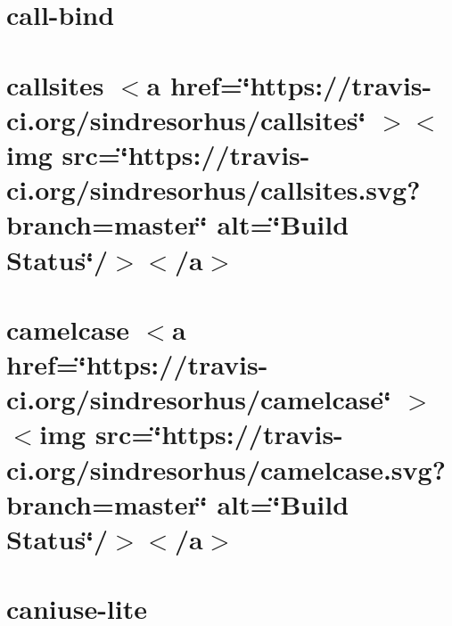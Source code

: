 \documentclass[twoside]{book}
\newcommand{\+}{\discretionary{\mbox{\scriptsize$\hookleftarrow$}}{}{}}
\begin{document}
\chapter{call-\/bind}
\label{md__c___users_vaishnavi_jadhav__desktop__developer_code_mean_stack_example_client_node_modules_call_bind__r_e_a_d_m_e}

\chapter{callsites \texorpdfstring{$<$}{<}a href=\char`\"{}https\+://travis-\/ci.\+org/sindresorhus/callsites\char`\"{} \texorpdfstring{$>$}{>}\texorpdfstring{$<$}{<}img src=\char`\"{}https\+://travis-\/ci.\+org/sindresorhus/callsites.\+svg?branch=master\char`\"{} alt=\char`\"{}\+Build Status\char`\"{}/\texorpdfstring{$>$}{>}\texorpdfstring{$<$}{<}/a\texorpdfstring{$>$}{>}}
\label{md__c___users_vaishnavi_jadhav__desktop__developer_code_mean_stack_example_client_node_modules_callsites_readme}

\chapter{camelcase \texorpdfstring{$<$}{<}a href=\char`\"{}https\+://travis-\/ci.\+org/sindresorhus/camelcase\char`\"{} \texorpdfstring{$>$}{>}\texorpdfstring{$<$}{<}img src=\char`\"{}https\+://travis-\/ci.\+org/sindresorhus/camelcase.\+svg?branch=master\char`\"{} alt=\char`\"{}\+Build Status\char`\"{}/\texorpdfstring{$>$}{>}\texorpdfstring{$<$}{<}/a\texorpdfstring{$>$}{>}}
\label{md__c___users_vaishnavi_jadhav__desktop__developer_code_mean_stack_example_client_node_modules_camelcase_readme}

\chapter{caniuse-\/lite}
\label{md__c___users_vaishnavi_jadhav__desktop__developer_code_mean_stack_example_client_node_modules_caniuse_lite__r_e_a_d_m_e}

\end{document}
